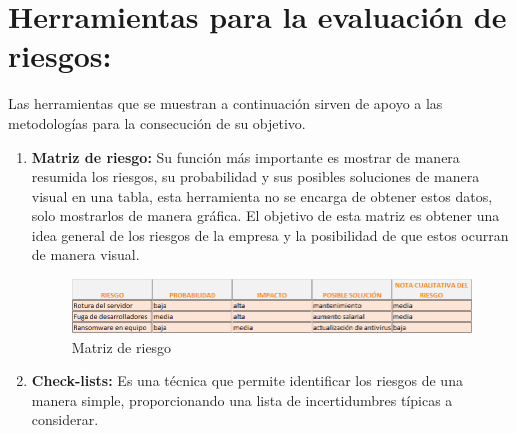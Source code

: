 \section{Herramientas  para la evaluación de riesgos:}
Las herramientas que se muestran a continuación sirven de apoyo a las metodologías para la consecución de su objetivo. \cite{herramientas-evaluacion-riesgos}
\begin{enumerate}

\item {\bfseries Matriz de riesgo:}
Su función más importante es mostrar de manera resumida los riesgos, su probabilidad  y sus posibles soluciones de manera visual en una tabla, esta herramienta no se encarga de obtener estos datos, solo mostrarlos de manera gráfica. El objetivo de esta matriz es obtener una idea general de los riesgos de la empresa y la posibilidad de que estos ocurran de manera visual.\cite{isot}
\begin{figure}[tphb]
  		   \centering
     		   \includegraphics[width=7in]{matriz_de_riesgo.png}
  		   \caption{Matriz de riesgo}
  		   \label{img:matriz_riesgo}
\end{figure}

\item {\bfseries Check-lists:}
Es una técnica que permite identificar los riesgos de una manera simple, proporcionando una lista de incertidumbres típicas a considerar.


\end{enumerate}
